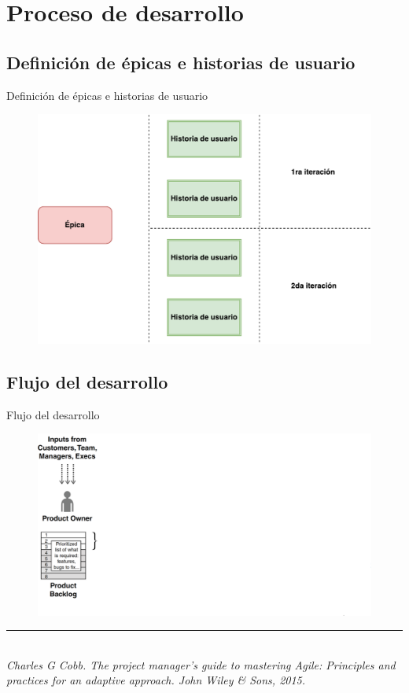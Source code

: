 \documentclass[10pt,xcolor=table ]{beamer}
\newcommand{\decoRule}{\rule{\textwidth}{.4pt}} %
\begin{document}
\section{Proceso de desarrollo}
\subsection{Definición de épicas e historias de usuario}
\begin{frame}{Definición de épicas e historias de usuario}
	\begin{figure}
		\centering
	    \includegraphics[scale=0.5]{../Figuras/epic_diagram}
	\end{figure}
\end{frame}

\subsection{Flujo del desarrollo}
\begin{frame}{Flujo del desarrollo}
	\begin{figure}
		\centering
	    \includegraphics[scale=0.235]{../Figuras/flujo_scrum_1}
	\end{figure}
	\decoRule \\
  	\tiny \textit{Charles G Cobb. The project manager’s guide to mastering Agile: Principles and practices for an adaptive approach. John Wiley \& Sons, 2015.} \\
\end{frame}
\end{document}
